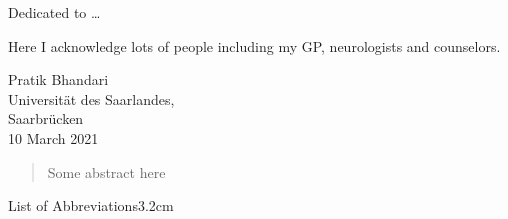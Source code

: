 \documentclass[a4paper, nobind]{templates/ociamthesis}
\begin{document}
\begin{romanpages}

\maketitle

\begin{dedication}
  Dedicated to \ldots{}
\end{dedication}



\begin{acknowledgements}
 	Here I acknowledge lots of people including my GP, neurologists and counselors.

  \begin{flushright}
  Pratik Bhandari \\
  Universität des Saarlandes,\\
  Saarbrücken \\
  10 March 2021
  \end{flushright}
\end{acknowledgements}





\renewcommand{\abstracttitle}{Abstract}
\begin{abstract}
	Some abstract here
\end{abstract}




\flushbottom

\tableofcontents

\listoffigures
	\mtcaddchapter

\listoftables
  \mtcaddchapter
\begin{mclistof}{List of Abbreviations}{3.2cm}


\end{mclistof}
\end{romanpages}
\end{document}
